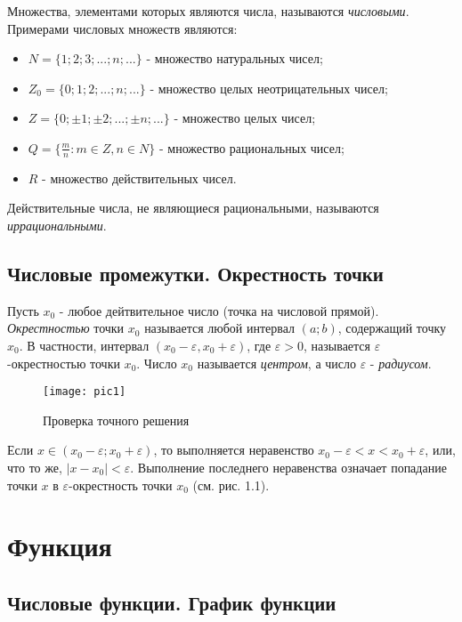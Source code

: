 \documentclass[14pt]{extreport}
\begin{document}
Множества, элементами которых являются числа, называются \emph{числовыми}. Примерами числовых множеств являются:
\begin{itemize}
\item $N = \{1; 2; 3; ...; n; ...\}$ - множество натуральных чисел;
\item $Z_0 = \{0; 1; 2; ...; n; ...\}$ - множество целых неотрицательных чисел;
\item $Z = \{0; \pm 1; \pm 2; ...; \pm n; ...\}$ - множество целых чисел;
\item $Q = \{\frac mn : m \in Z, n \in N\}$ - множество рациональных чисел;
\item $R$ - множество действительных чисел.
\end{itemize} 

Действительные числа, не являющиеся рациональными, называются \emph{иррациональными}.



\section{Числовые промежутки. Окрестность точки}

Пусть $x_0$ - любое дейтвительное число (точка на числовой прямой). \emph{Окрестностью} точки $x_0$ называется любой интервал $(a; b)$, содержащий точку $x_0$. В частности, интервал $(x_0 - \varepsilon, x_0 + \varepsilon)$, где $\varepsilon > 0$, называется $\varepsilon$-окрестностью точки $x_0$. Число $x_0$ называется \emph{центром}, а число $\varepsilon$ - \emph{радиусом}.

\begin{figure}[H]
\centerline{\texttt{[image: pic1]}}
\caption{Проверка точного решения}
\label{fig11}
\end{figure}

Если $x \in (x_0 - \varepsilon; x_0 + \varepsilon)$, то выполняется неравенство $x_0 - \varepsilon < x < x_0 + \varepsilon$, или, что то же, $|x - x_0| < \varepsilon$. Выполнение последнего неравенства означает попадание точки $x$ в $\varepsilon$-окрестность точки $x_0$ (см. рис. 1.1).






\chapter{Функция}


\section{Числовые функции. График функции}
\end{document}
